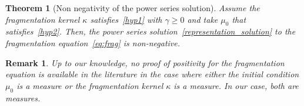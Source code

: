 \documentclass[10pt,a4paper]{amsart}
\numberwithin{equation}{section}
\newtheorem{theo}[defi]{Theorem}
\newtheorem{rema}[defi]{Remark}
\begin{document}
\begin{theo}[Non negativity of the power series solution]\label{thm:positivity}
Assume the fragmentation kernel $\kappa$ satisfies~\eqref{hyp1} with $\gamma \geq 0$ and take $\mu_0$ that satisfies~\eqref{hyp2}. Then, the power series solution~\eqref{representation_solution} to the fragmentation equation~\eqref{eq:frag} is non-negative.
\end{theo}

\begin{rema}
Up to our knowledge, no proof of positivity for the fragmentation equation is available in the literature in the case where either the initial condition $\mu_0$ is a measure or the fragmentation kernel $\kappa$ is a measure. In our case, both are measures.
\end{rema}
\end{document}
